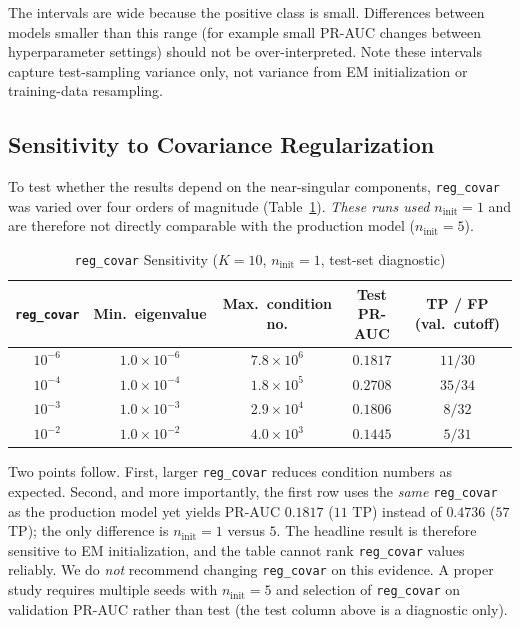 \documentclass[conference]{IEEEtran}
\begin{document}
The intervals are wide because the positive class is small. Differences between models smaller than this range (for example small PR-AUC changes between hyperparameter settings) should not be over-interpreted. Note these intervals capture test-sampling variance only, not variance from EM initialization or training-data resampling.

\subsection{Sensitivity to Covariance Regularization}
\label{sec:regcov}
To test whether the results depend on the near-singular components, \texttt{reg\_covar} was varied over four orders of magnitude (Table~\ref{tab:regcov}). \emph{These runs used $n_{\text{init}}=1$} and are therefore not directly comparable with the production model ($n_{\text{init}}=5$).

\begin{table}[!t]
\centering
\caption{\texttt{reg\_covar} Sensitivity ($K=10$, $n_{\text{init}}=1$, test-set diagnostic)}
\renewcommand{\arraystretch}{1.15}
\small
\begin{tabular}{ccccc}
\toprule
\textbf{\texttt{reg\_covar}} & \textbf{Min.\ eigenvalue} & \textbf{Max.\ condition no.} & \textbf{Test PR-AUC} & \textbf{TP / FP (val.\ cutoff)} \\
\midrule
$10^{-6}$ & $1.0\times10^{-6}$ & $7.8\times10^{6}$ & $0.1817$ & $11 / 30$ \\
$10^{-4}$ & $1.0\times10^{-4}$ & $1.8\times10^{5}$ & $0.2708$ & $35 / 34$ \\
$10^{-3}$ & $1.0\times10^{-3}$ & $2.9\times10^{4}$ & $0.1806$ & $8 / 32$ \\
$10^{-2}$ & $1.0\times10^{-2}$ & $4.0\times10^{3}$ & $0.1445$ & $5 / 31$ \\
\bottomrule
\end{tabular}
\label{tab:regcov}
\end{table}

Two points follow. First, larger \texttt{reg\_covar} reduces condition numbers as expected. Second, and more importantly, the first row uses the \emph{same} \texttt{reg\_covar} as the production model yet yields PR-AUC $0.1817$ ($11$ TP) instead of $0.4736$ ($57$ TP); the only difference is $n_{\text{init}}=1$ versus $5$. The headline result is therefore sensitive to EM initialization, and the table cannot rank \texttt{reg\_covar} values reliably. We do \emph{not} recommend changing \texttt{reg\_covar} on this evidence. A proper study requires multiple seeds with $n_{\text{init}}=5$ and selection of \texttt{reg\_covar} on validation PR-AUC rather than test (the test column above is a diagnostic only).
\end{document}
